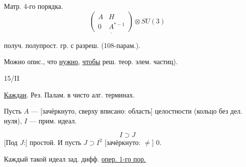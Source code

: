 Матр. 4-го порядка.
\begin{equation*}
\underline{\begin{pmatrix}A&H\\0&A^{*-1}\end{pmatrix}}\otimes SU(3)
\end{equation*}
\par\noindent\begin{minipage}{\linewidth}
получ. полупрост. гр. с \textcolor{orange!65!black}{разреш.} (108-парам.).
\end{minipage}\par
Можно опис., что \underline{нужно}, \underline{чтобы} реш. теор. элем. частиц).

15/II\par\underline{Каждан}.
Рез. Палам. в чисто алг. терминах.
\par\noindent\begin{minipage}{\linewidth}
Пусть $A$ — [зачёркнуто, сверху вписано: область]
целостности (кольцо без дел. нуля), $I$ — прим. идеал.
\end{minipage}\par
\par\noindent\begin{minipage}{\linewidth}
\begin{equation*}
I\supset J
\end{equation*}
[Под $J$:] простой.
И пусть $J\supset I^2$ [зачёркнуто: $\neq$] $0$.
\end{minipage}\par
Каждый такой идеал зад. дифф. \underline{опер. \underline{1-го пор.}}

